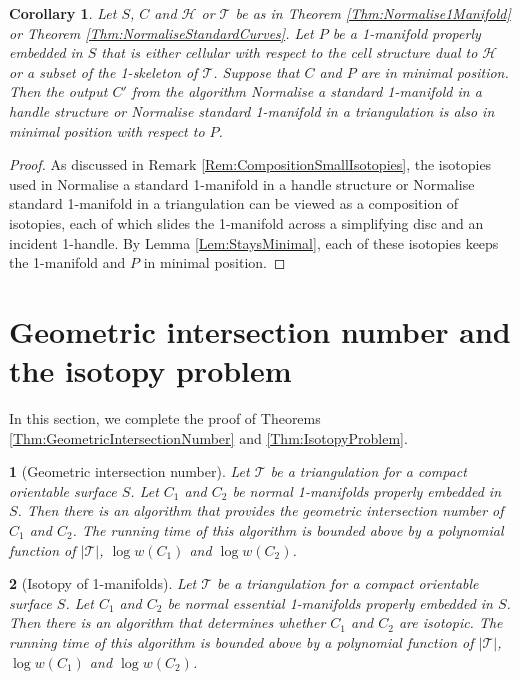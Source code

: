 \documentclass[oneside]{amsart}
\numberwithin{equation}{section}
\theoremstyle{plain}
\newtheorem{corollary}[equation]{Corollary}
\newtheorem*{namedtheorem}{\theoremname}
\newcommand{\theoremname}{testing}
\newenvironment{named}[1]{\renewcommand{\theoremname}{#1}\begin{namedtheorem}}{\end{namedtheorem}}
\theoremstyle{definition}
\newcommand{\calT}{{\mathcal{T}}}
\newcommand{\calH}{\mathcal{H}}
\begin{document}
\begin{corollary}
\label{Cor:RemainsMinimalPosition}
Let $S$, $C$ and $\calH$ or $\calT$ be as in Theorem \ref{Thm:Normalise1Manifold} or Theorem \ref{Thm:NormaliseStandardCurves}. Let $P$ be a 1-manifold properly embedded in $S$ that is either cellular with respect to the cell structure dual to $\calH$ or a subset of the 1-skeleton of $\calT$. Suppose that $C$ and $P$ are in minimal position. Then the output $C'$ from the algorithm {\sc Normalise a standard 1-manifold in a handle structure} or {\sc Normalise standard 1-manifold in a triangulation} is also in minimal position with respect to $P$.
\end{corollary}

\begin{proof} As discussed in Remark \ref{Rem:CompositionSmallIsotopies}, the isotopies used in {\sc Normalise a standard 1-manifold in a handle structure} or {\sc Normalise standard 1-manifold in a triangulation} can be viewed as a composition of isotopies, each of which slides the 1-manifold across a simplifying disc and an incident 1-handle. By Lemma \ref{Lem:StaysMinimal}, each of these isotopies keeps the 1-manifold and $P$ in minimal position.
\end{proof}

\section{Geometric intersection number and the isotopy problem}
\label{Sec:GeometricIntersectionNumber}

In this section, we complete the proof of Theorems \ref{Thm:GeometricIntersectionNumber} and \ref{Thm:IsotopyProblem}.

\begin{named}{Theorem \ref{Thm:GeometricIntersectionNumber}}[{\sc Geometric intersection number}]
Let $\mathcal{T}$ be a triangulation for a compact orientable surface $S$. Let $C_1$ and $C_2$ be normal 1-manifolds properly embedded in $S$. Then there is an algorithm that provides the geometric intersection number of $C_1$ and $C_2$. The running time of this algorithm is bounded above by a polynomial function of $|\mathcal{T}|$, $\log w(C_1)$ and $\log w(C_2)$.
\end{named}

\begin{named}{Theorem \ref{Thm:IsotopyProblem}}[{\sc Isotopy of 1-manifolds}]
Let $\mathcal{T}$ be a triangulation for a compact orientable surface $S$. Let $C_1$ and $C_2$ be normal essential 1-manifolds properly embedded in $S$. Then there is an algorithm that determines whether $C_1$ and $C_2$ are isotopic. The running time of this algorithm is bounded above by a polynomial function of $|\mathcal{T}|$, $\log w(C_1)$ and $\log w(C_2)$.
\end{named}
\end{document}
